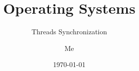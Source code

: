 \documentclass[12pt]{beamer}
\title{Operating Systems}
\subtitle{Threads Synchronization}
\author{Me}
\date{\today}
\begin{document}
  \begin{frame}
    \titlepage
  \end{frame}

  
  
  
  

%    
\end{document}
